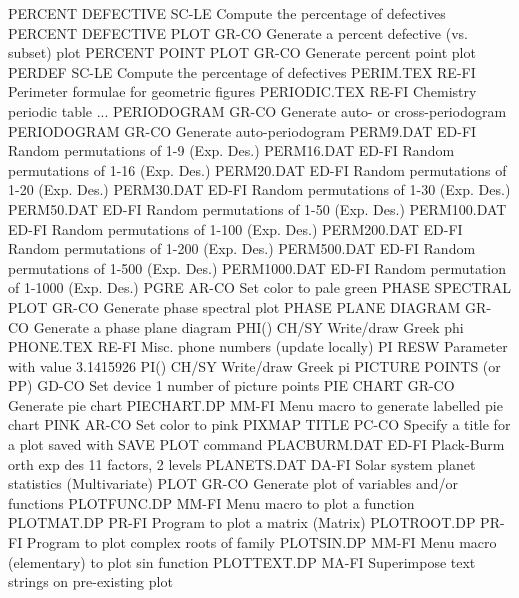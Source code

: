 PERCENT DEFECTIVE           SC-LE Compute the percentage of defectives 
PERCENT DEFECTIVE PLOT      GR-CO Generate a percent defective (vs. subset) plot
PERCENT POINT PLOT          GR-CO Generate percent point plot
PERDEF                      SC-LE Compute the percentage of defectives
PERIM.TEX                   RE-FI Perimeter formulae for geometric figures
PERIODIC.TEX                RE-FI Chemistry periodic table
... PERIODOGRAM             GR-CO Generate auto- or cross-periodogram
PERIODOGRAM                 GR-CO Generate auto-periodogram
PERM9.DAT                   ED-FI Random permutations of 1-9    (Exp. Des.)
PERM16.DAT                  ED-FI Random permutations of 1-16   (Exp. Des.)
PERM20.DAT                  ED-FI Random permutations of 1-20   (Exp. Des.)
PERM30.DAT                  ED-FI Random permutations of 1-30   (Exp. Des.)
PERM50.DAT                  ED-FI Random permutations of 1-50   (Exp. Des.)
PERM100.DAT                 ED-FI Random permutations of 1-100  (Exp. Des.)
PERM200.DAT                 ED-FI Random permutations of 1-200  (Exp. Des.)
PERM500.DAT                 ED-FI Random permutations of 1-500  (Exp. Des.)
PERM1000.DAT                ED-FI Random permutation  of 1-1000 (Exp. Des.)
PGRE                        AR-CO Set color to pale green
PHASE SPECTRAL PLOT         GR-CO Generate phase spectral plot
PHASE PLANE DIAGRAM         GR-CO Generate a phase plane diagram
PHI()                       CH/SY Write/draw Greek phi
PHONE.TEX                   RE-FI Misc. phone numbers (update locally)
PI                          RESW  Parameter with value 3.1415926
PI()                        CH/SY Write/draw Greek pi
PICTURE POINTS (or PP)      GD-CO Set device 1 number of picture points
PIE CHART                   GR-CO Generate pie chart
PIECHART.DP                 MM-FI Menu macro to generate labelled pie chart
PINK                        AR-CO Set color to pink
PIXMAP TITLE                PC-CO Specify a title for a plot saved with SAVE PLOT command
PLACBURM.DAT                ED-FI Plack-Burm orth exp des 11 factors, 2 levels
PLANETS.DAT                 DA-FI Solar system planet statistics (Multivariate)
PLOT                        GR-CO Generate plot of variables and/or functions
PLOTFUNC.DP                 MM-FI Menu macro to plot a function
PLOTMAT.DP                  PR-FI Program to plot a matrix (Matrix)
PLOTROOT.DP                 PR-FI Program to plot complex roots of family
PLOTSIN.DP                  MM-FI Menu macro (elementary) to plot sin function
PLOTTEXT.DP                 MA-FI Superimpose text strings on pre-existing plot
